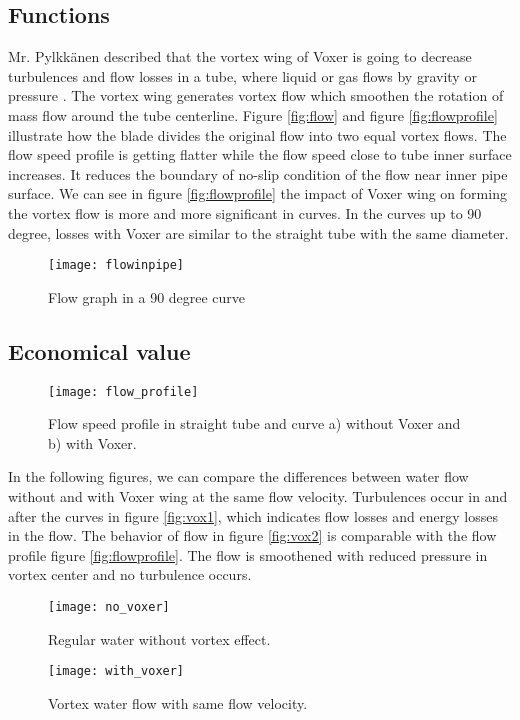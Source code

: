 \subsection{Functions}
Mr. Pylkkänen described that the vortex wing of Voxer is going to decrease turbulences and flow losses in a tube, where liquid or gas flows by gravity or pressure \cite{voxer:article}. The vortex wing generates vortex flow which smoothen the rotation of mass flow around the tube centerline. Figure \vref{fig:flow} and figure \vref{fig:flowprofile} illustrate how the blade divides the original flow into two equal vortex flows. The flow speed profile is getting flatter while the flow speed close to tube inner surface increases. It reduces the boundary of no-slip condition of the flow near inner pipe surface. We can see in figure \vref{fig:flowprofile} the impact of Voxer wing on forming the vortex flow is more and more significant in curves. In the curves up to 90 degree, losses with Voxer are similar to the straight tube with the same diameter. 
\begin{figure}[h]
  \centering
  \texttt{[image: flowinpipe]}
  \caption{ Flow graph in a 90 degree curve\cite{voxer:article}}
  \label{fig:flow}
\end{figure}
\subsection{Economical value}
\begin{figure}[h]
  \centering
  \texttt{[image: flow\_profile]}
  \caption{ Flow speed profile in straight tube and curve \newline a) without Voxer and b) with Voxer. \cite{voxer:article}}
  \label{fig:flowprofile}
\end{figure}

In the following figures, we can compare the differences between water flow without and with Voxer wing at the same flow velocity. Turbulences occur in and after the curves in figure \vref{fig:vox1}, which indicates flow losses and energy losses in the flow. The behavior of flow in figure \vref{fig:vox2} is comparable with the flow profile figure \vref{fig:flowprofile}. The flow is smoothened with reduced pressure in vortex center and no turbulence occurs.
\begin{figure}[h]
  \centering
  \texttt{[image: no\_voxer]}
  \caption{ Regular water without vortex effect.\cite{voxer:article}}
  \label{fig:vox1}
\end{figure}
\begin{figure}[h]
  \centering
  \texttt{[image: with\_voxer]}
  \caption{ Vortex water flow with same flow velocity.\cite{voxer:article}}
  \label{fig:vox2}
\end{figure}

